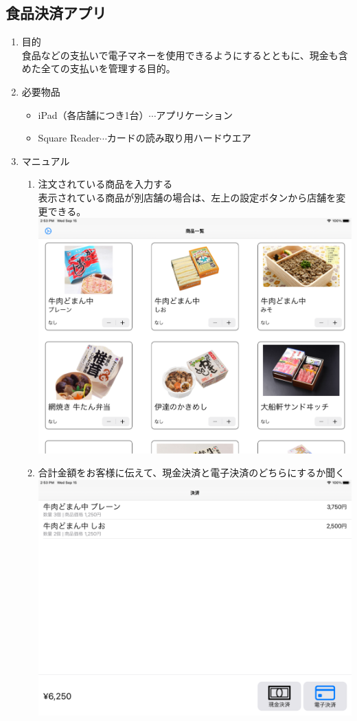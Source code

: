\documentclass[dvipdfmx,jb5]{jarticle}
\begin{document}
 \subsection{食品決済アプリ}
  \begin{enumerate}
   \item 目的\\
   食品などの支払いで電子マネーを使用できるようにするとともに、現金も含めた全ての支払いを管理する目的。
   \item 必要物品
   \begin{itemize}
   \item iPad（各店舗につき1台）$\cdots$アプリケーション
   \item Square Reader$\cdots$カードの読み取り用ハードウエア
   \end{itemize}
   \item マニュアル
   \begin{enumerate}
   \item 注文されている商品を入力する\\
   表示されている商品が別店舗の場合は、左上の設定ボタンから店舗を変更できる。\\
   \includegraphics[scale=0.15]{assets/square_top-interface.png}
   \item 合計金額をお客様に伝えて、現金決済と電子決済のどちらにするか聞く\\
   \includegraphics[scale=0.15]{assets/square_second-interface.png}

\end{enumerate}
\end{enumerate}
\end{document}
